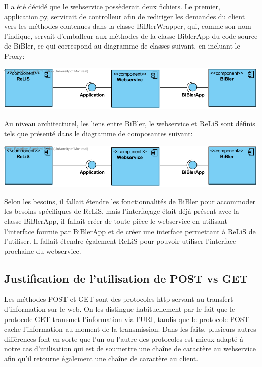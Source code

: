 \documentclass[12pt,titlepage]{article}
\begin{document}
Il a été décidé que le webservice possèderait deux fichiers. Le premier, application.py, servirait de controlleur afin de rediriger les demandes du client vers les méthodes contenues dans la classe BiBlerWrapper, qui, comme son nom l'indique, servait d'emballeur aux méthodes de la classe BiblerApp du code source de BiBler, ce qui correspond au diagramme de classes suivant, en incluant le Proxy:


\includegraphics{ClassDiagram.png}


Au niveau architecturel, les liens entre BiBler, le webservice et ReLiS sont définis tels que présenté dans le diagramme de composantes suivant:

\includegraphics{ComponentDiagram.png}

Selon les besoins, il fallait étendre les fonctionnalités de BiBler pour accommoder les besoins spécifiques de ReLiS, mais l'interfaçage était déjà présent avec la classe BiBlerApp, il fallait créer de toute pièce le webservice en utilisant l'interface fournie par BiBlerApp et de créer une interface permettant à ReLiS de l'utiliser. Il fallait étendre également ReLiS pour pouvoir utiliser l'interface prochaine du webservice. \newline



\subsection{Justification de l'utilisation de POST vs GET}
Les méthodes POST et GET sont des protocoles http servant au transfert d'information sur le web. On les distingue habituellement par le fait que le protocole GET transmet l'information via l'URI, tandis que le protocole POST cache l'information au moment de la transmission. Dans les faits, plusieurs autres différences font en sorte que l'un ou l'autre des protocoles est mieux adapté à notre cas d'utilisation qui est de soumettre une chaîne de caractère au webservice afin qu'il retourne également une chaîne de caractère au client.\newline
\end{document}
